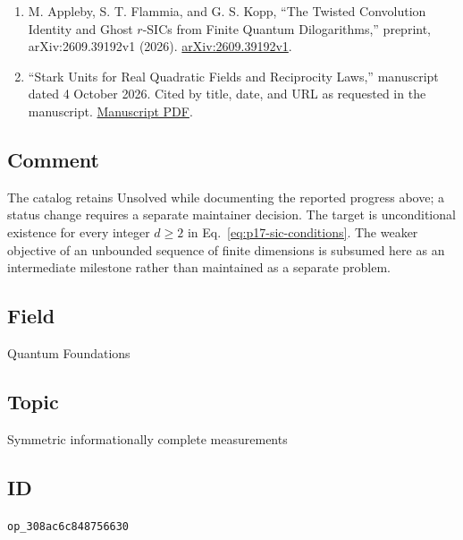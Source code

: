 \begin{enumerate}[label={},leftmargin=4.8em,labelsep=0.5em]
  \item[\textup{[AFK26]}]\label{ref:p17-twisted-convolution}
  M. Appleby, S. T. Flammia, and G. S. Kopp,
  ``The Twisted Convolution Identity and Ghost $r$-SICs from Finite
  Quantum Dilogarithms,'' preprint, arXiv:2609.39192v1 (2026).
  \href{https://arxiv.org/abs/2609.39192v1}{arXiv:2609.39192v1}.

  \item[\textup{[SU26]}]\label{ref:p17-stark-reciprocity}
  ``Stark Units for Real Quadratic Fields and Reciprocity Laws,''
  manuscript dated 4 October 2026. Cited by title, date, and URL as requested
  in the manuscript.
  \href{https://www.danrad.net/papers/stark-reciprocity.pdf}{Manuscript PDF}.
\end{enumerate}

\subsection*{Comment}

The catalog retains Unsolved while documenting the reported progress above;
  a status change requires a separate maintainer decision. The target is
  unconditional existence for every integer $d\ge2$ in
  Eq.~\eqref{eq:p17-sic-conditions}. The weaker objective of an unbounded
  sequence of finite dimensions is subsumed here as an intermediate milestone
  rather than maintained as a separate problem.

\subsection*{Field}

Quantum Foundations

\subsection*{Topic}

Symmetric informationally complete measurements

\subsection*{ID}

\texttt{op\_308ac6c848756630}
